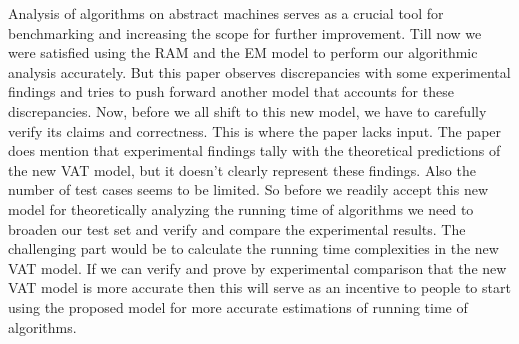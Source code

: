 Analysis of algorithms on abstract machines serves as a crucial tool for benchmarking and increasing the scope for further improvement. Till now we were satisfied using the RAM and the EM model to perform our algorithmic analysis accurately. But this paper observes discrepancies with some experimental findings and tries to push forward another model that accounts for these discrepancies. Now, before we all shift to this new model, we have to carefully verify its claims and correctness. This is where the paper lacks input. The paper does mention that experimental findings tally with the theoretical predictions of the new VAT model, but it doesn’t clearly represent these findings. Also the number of test cases seems to be limited. So before we readily accept this new model for theoretically analyzing the running time of algorithms we need to broaden our test set and verify and compare the experimental results. The challenging part would be to calculate the running time complexities in the new VAT model. If we can verify and prove by experimental comparison that the new VAT model is more accurate then this will serve as an incentive to people to start using the proposed model for more accurate estimations of running time of algorithms.
